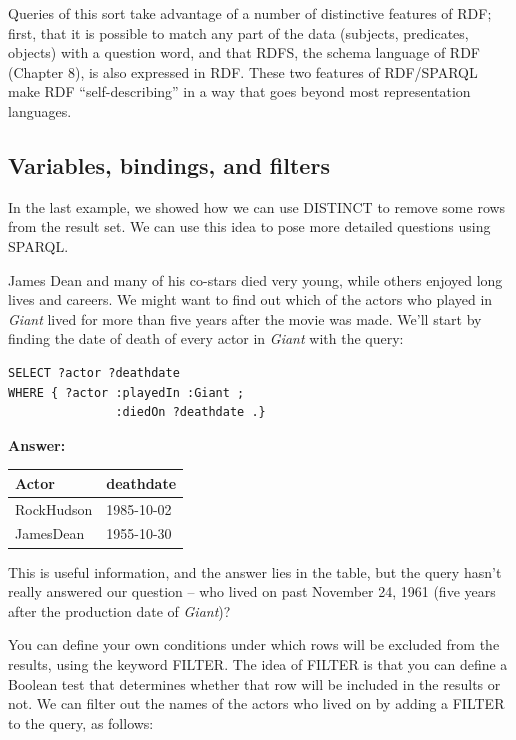 Queries of this sort take advantage of a number of distinctive features
of RDF; first, that it is possible to match any part of the data
(subjects, predicates, objects) with a question word, and that RDFS, the
schema language of RDF (Chapter 8), is also expressed in RDF. These two
features of RDF/SPARQL make RDF ``self-describing'' in a way that goes
beyond most representation languages.

\subsection{Variables, bindings, and filters}

In the last example, we showed how we can use DISTINCT to remove some
rows from the result set. We can use this idea to pose more detailed
questions using SPARQL.

James Dean and many of his co-stars died very young, while others
enjoyed long lives and careers. We might want to find out which of the
actors who played in \emph{Giant} lived for more than five years after
the movie was made. We'll start by finding the date of death of every
actor in \emph{Giant} with the query:


\begin{lstlisting}
SELECT ?actor ?deathdate
WHERE { ?actor :playedIn :Giant ;
               :diedOn ?deathdate .}
\end{lstlisting}

\textbf{\textbf{Answer:}}

\begin{tabular}{|ll|}
\hline
Actor&deathdate\\
\hline
RockHudson&1985-10-02\\
JamesDean&1955-10-30\\

\hline
\end{tabular}


This is useful information, and the answer lies in the table, but the
query hasn't really answered our question -- who lived on past November
24, 1961 (five years after the production date of \emph{Giant})?

You can define your own conditions under which rows will be excluded
from the results, using the keyword FILTER. The idea of FILTER is that
you can define a Boolean test that determines whether that row will be
included in the results or not. We can filter out the names of the
actors who lived on by adding a FILTER to the query, as follows:

